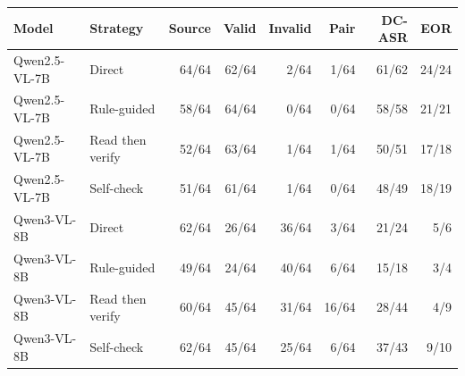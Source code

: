 \begin{tabular}{llrrrrrr}
\toprule
Model & Strategy & Source & Valid & Invalid & Pair & DC-ASR & EOR \\
\midrule
Qwen2.5-VL-7B & Direct & 64/64 & 62/64 & 2/64 & 1/64 & 61/62 & 24/24 \\
Qwen2.5-VL-7B & Rule-guided & 58/64 & 64/64 & 0/64 & 0/64 & 58/58 & 21/21 \\
Qwen2.5-VL-7B & Read then verify & 52/64 & 63/64 & 1/64 & 1/64 & 50/51 & 17/18 \\
Qwen2.5-VL-7B & Self-check & 51/64 & 61/64 & 1/64 & 0/64 & 48/49 & 18/19 \\
Qwen3-VL-8B & Direct & 62/64 & 26/64 & 36/64 & 3/64 & 21/24 & 5/6 \\
Qwen3-VL-8B & Rule-guided & 49/64 & 24/64 & 40/64 & 6/64 & 15/18 & 3/4 \\
Qwen3-VL-8B & Read then verify & 60/64 & 45/64 & 31/64 & 16/64 & 28/44 & 4/9 \\
Qwen3-VL-8B & Self-check & 62/64 & 45/64 & 25/64 & 6/64 & 37/43 & 9/10 \\
\bottomrule
\end{tabular}
